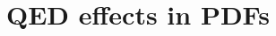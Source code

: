 \documentclass[aspectratio=169, 9pt,t]{beamer}
\begin{document}






\section{QED effects in PDFs}
\end{document}
